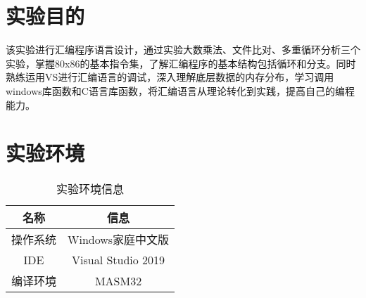%
%
%
%
%
%

\chapter{实验目的}
该实验进行汇编程序语言设计，通过实验大数乘法、文件比对、多重循环分析三个实验，掌握80x86的基本指令集，了解汇编程序的基本结构包括循环和分支。同时熟练运用VS进行汇编语言的调试，深入理解底层数据的内存分布，学习调用windows库函数和C语言库函数，将汇编语言从理论转化到实践，提高自己的编程能力。
\chapter{实验环境}
\begin{table}[htbp]
  \linespread{2}
  \centering
  \setlength{\tabcolsep}{10mm}
  \caption{实验环境信息}\label{实验环境信息}
  \begin{tabular}{cc}
    \hline
    名称    & 信息   \\  \hline
    操作系统    & Windows家庭中文版  \\
    IDE & Visual Studio 2019    \\ 
    编译环境    & MASM32     \\  \hline
    \end{tabular}
\end{table}

